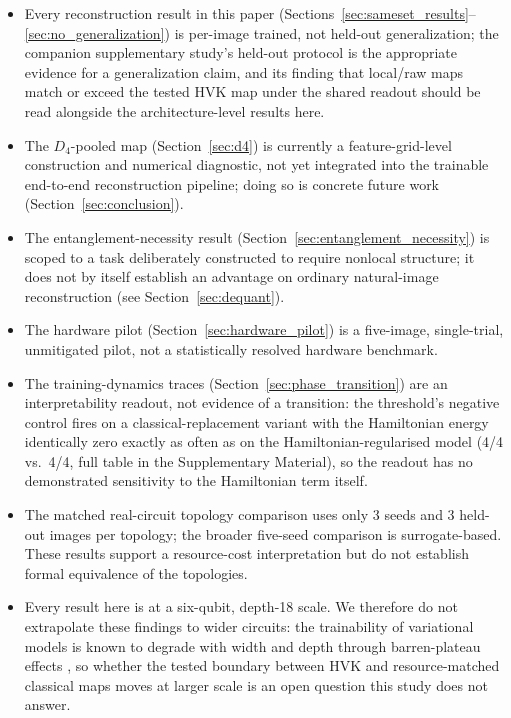 \documentclass[pdflatex,sn-basic]{sn-jnl}
\begin{document}
\begin{itemize}\itemsep4pt
  \item Every reconstruction result in this paper
        (Sections~\ref{sec:sameset_results}--\ref{sec:no_generalization}) is
        per-image trained, not held-out generalization; the companion
        supplementary study's held-out protocol is the appropriate evidence for a
        generalization claim, and its finding that local/raw maps match or exceed
        the tested HVK map under the shared readout should be read alongside the
        architecture-level results here.
  \item The $D_4$-pooled map (Section~\ref{sec:d4}) is currently a
        feature-grid-level construction and numerical diagnostic, not yet
        integrated into the trainable end-to-end reconstruction pipeline; doing
        so is concrete future work (Section~\ref{sec:conclusion}).
  \item The entanglement-necessity result
        (Section~\ref{sec:entanglement_necessity}) is scoped to a task
        deliberately constructed to require nonlocal structure; it does not by
        itself establish an advantage on ordinary natural-image reconstruction
        (see Section~\ref{sec:dequant}).
  \item The hardware pilot (Section~\ref{sec:hardware_pilot}) is a five-image,
        single-trial, unmitigated pilot, not a statistically resolved hardware
        benchmark.
  \item The training-dynamics traces (Section~\ref{sec:phase_transition}) are an
        interpretability readout, not evidence of a transition: the threshold's
        negative control fires on a classical-replacement variant with the
        Hamiltonian energy identically zero exactly as often as on the
        Hamiltonian-regularised model (4/4 vs.\ 4/4, full table in the
        Supplementary Material), so the readout has no demonstrated sensitivity
        to the Hamiltonian term itself.
  \item The matched real-circuit topology comparison uses only 3 seeds and 3
        held-out images per topology; the broader five-seed comparison is
        surrogate-based. These results support a resource-cost interpretation but
        do not establish formal equivalence of the topologies.
  \item Every result here is at a six-qubit, depth-18 scale. We therefore do not
        extrapolate these findings to wider circuits: the trainability of
        variational models is known to degrade with width and depth through
        barren-plateau effects \citep{McClean2018, Larocca2025}, so whether the
        tested boundary between HVK and resource-matched classical maps moves at
        larger scale is an open question this study does not answer.
\end{itemize}
\end{document}
